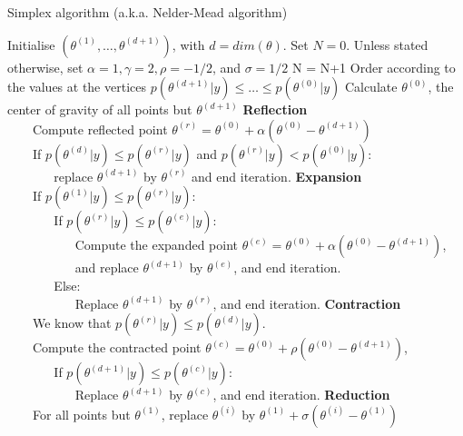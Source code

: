 \documentclass[a4paper,11pt,titlepage]{article}
\theoremstyle{plain} %
\begin{document}
\begin{algorithm}[H]
\caption{Simplex algorithm (a.k.a. Nelder-Mead algorithm)}
\label{alg:simplex}
{\fontsize{12}{20}\selectfont
\begin{algorithmic}
\STATE Initialise $(\theta^{(1)},\dots,\theta^{(d+1)})$, with $d=dim(\theta)$.
\STATE Set $N=0$.
\STATE Unless stated otherwise, set $\alpha = 1,\gamma=2,\rho = -1/2$, and $\sigma=1/2$
	\STATE N = N+1
	\STATE Order according to the values at the vertices $p(\theta^{(d+1)}|y)\leq\dots\leq p(\theta^{(0)}|y)$
	\STATE Calculate $\theta^{(0)}$, the center of gravity of all points but $\theta^{(d+1)}$
	\STATE \textbf{Reflection}\\
	$\;\;\;\;\;\;$ Compute reflected point $\theta^{(r)}=\theta^{(0)}+\alpha(\theta^{(0)}-\theta^{(d+1)})$\\
	$\;\;\;\;\;\;$ If $p(\theta^{(d)}|y)\leq p(\theta^{(r)}|y)$ and $p(\theta^{(r)}|y)< p(\theta^{(0)}|y)$:\\
	$\;\;\;\;\;\;$$\;\;\;\;\;\;$ replace $\theta^{(d+1)}$ by $\theta^{(r)}$ and end iteration.
	\STATE \textbf{Expansion}\\
	$\;\;\;\;\;\;$ If $p(\theta^{(1)}|y)\leq p(\theta^{(r)}|y)$:\\
	$\;\;\;\;\;\;$$\;\;\;\;\;\;$ If $p(\theta^{(r)}|y)\leq p(\theta^{(e)}|y)$:\\
	$\;\;\;\;\;\;$$\;\;\;\;\;\;$$\;\;\;\;\;\;$ Compute the expanded point $\theta^{(e)}=\theta^{(0)}+\alpha(\theta^{(0)}-\theta^{(d+1)})$,\\
	$\;\;\;\;\;\;$$\;\;\;\;\;\;$$\;\;\;\;\;\;$ and replace $\theta^{(d+1)}$ by $\theta^{(e)}$, and end iteration.\\
	$\;\;\;\;\;\;$$\;\;\;\;\;\;$ Else:\\
	$\;\;\;\;\;\;$$\;\;\;\;\;\;$$\;\;\;\;\;\;$ Replace $\theta^{(d+1)}$ by $\theta^{(r)}$, and end iteration.
	\STATE \textbf{Contraction}\\
	$\;\;\;\;\;\;$ We know that $p(\theta^{(r)}|y)\leq p(\theta^{(d)}|y)$.\\
	$\;\;\;\;\;\;$ Compute the contracted point $\theta^{(c)}=\theta^{(0)}+\rho(\theta^{(0)}-\theta^{(d+1)})$,\\
	$\;\;\;\;\;\;$$\;\;\;\;\;\;$ If $p(\theta^{(d+1)}|y)\leq p(\theta^{(c)}|y)$:\\
	$\;\;\;\;\;\;$$\;\;\;\;\;\;$$\;\;\;\;\;\;$ Replace $\theta^{(d+1)}$ by $\theta^{(c)}$, and end iteration.
	\STATE \textbf{Reduction}\\
	$\;\;\;\;\;\;$ For all points but $\theta^{(1)}$, replace $\theta^{(i)}$ by $\theta^{(1)}+\sigma(\theta^{(i)}-\theta^{(1)})$
\ENDWHILE
\end{algorithmic}
}
\end{algorithm}
\end{document}
